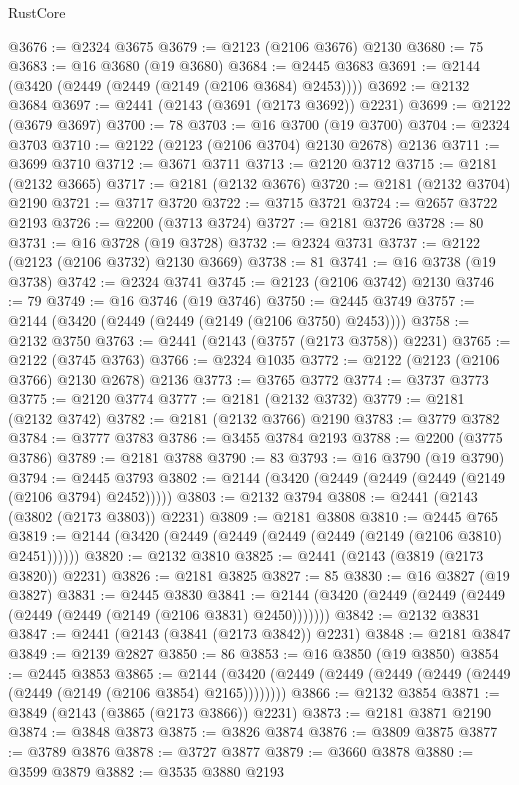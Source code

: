 \begin{lexlean}{RustCore}
\begin{coremodule}
@3676 := @2324 @3675
@3679 := @2123 (@2106 @3676) @2130
@3680 := 75
@3683 := @16 @3680 (@19 @3680)
@3684 := @2445 @3683
@3691 := @2144 (@3420 (@2449 (@2449 (@2149 (@2106 @3684) @2453))))
@3692 := @2132 @3684
@3697 := @2441 (@2143 (@3691 (@2173 @3692)) @2231)
@3699 := @2122 (@3679 @3697)
@3700 := 78
@3703 := @16 @3700 (@19 @3700)
@3704 := @2324 @3703
@3710 := @2122 (@2123 (@2106 @3704) @2130 @2678) @2136
@3711 := @3699 @3710
@3712 := @3671 @3711
@3713 := @2120 @3712
@3715 := @2181 (@2132 @3665)
@3717 := @2181 (@2132 @3676)
@3720 := @2181 (@2132 @3704) @2190
@3721 := @3717 @3720
@3722 := @3715 @3721
@3724 := @2657 @3722 @2193
@3726 := @2200 (@3713 @3724)
@3727 := @2181 @3726
@3728 := 80
@3731 := @16 @3728 (@19 @3728)
@3732 := @2324 @3731
@3737 := @2122 (@2123 (@2106 @3732) @2130 @3669)
@3738 := 81
@3741 := @16 @3738 (@19 @3738)
@3742 := @2324 @3741
@3745 := @2123 (@2106 @3742) @2130
@3746 := 79
@3749 := @16 @3746 (@19 @3746)
@3750 := @2445 @3749
@3757 := @2144 (@3420 (@2449 (@2449 (@2149 (@2106 @3750) @2453))))
@3758 := @2132 @3750
@3763 := @2441 (@2143 (@3757 (@2173 @3758)) @2231)
@3765 := @2122 (@3745 @3763)
@3766 := @2324 @1035
@3772 := @2122 (@2123 (@2106 @3766) @2130 @2678) @2136
@3773 := @3765 @3772
@3774 := @3737 @3773
@3775 := @2120 @3774
@3777 := @2181 (@2132 @3732)
@3779 := @2181 (@2132 @3742)
@3782 := @2181 (@2132 @3766) @2190
@3783 := @3779 @3782
@3784 := @3777 @3783
@3786 := @3455 @3784 @2193
@3788 := @2200 (@3775 @3786)
@3789 := @2181 @3788
@3790 := 83
@3793 := @16 @3790 (@19 @3790)
@3794 := @2445 @3793
@3802 := @2144 (@3420 (@2449 (@2449 (@2449 (@2149 (@2106 @3794) @2452)))))
@3803 := @2132 @3794
@3808 := @2441 (@2143 (@3802 (@2173 @3803)) @2231)
@3809 := @2181 @3808
@3810 := @2445 @765
@3819 := @2144 (@3420 (@2449 (@2449 (@2449 (@2449 (@2149 (@2106 @3810) @2451))))))
@3820 := @2132 @3810
@3825 := @2441 (@2143 (@3819 (@2173 @3820)) @2231)
@3826 := @2181 @3825
@3827 := 85
@3830 := @16 @3827 (@19 @3827)
@3831 := @2445 @3830
@3841 := @2144 (@3420 (@2449 (@2449 (@2449 (@2449 (@2449 (@2149 (@2106 @3831) @2450)))))))
@3842 := @2132 @3831
@3847 := @2441 (@2143 (@3841 (@2173 @3842)) @2231)
@3848 := @2181 @3847
@3849 := @2139 @2827
@3850 := 86
@3853 := @16 @3850 (@19 @3850)
@3854 := @2445 @3853
@3865 := @2144 (@3420 (@2449 (@2449 (@2449 (@2449 (@2449 (@2449 (@2149 (@2106 @3854) @2165))))))))
@3866 := @2132 @3854
@3871 := @3849 (@2143 (@3865 (@2173 @3866)) @2231)
@3873 := @2181 @3871 @2190
@3874 := @3848 @3873
@3875 := @3826 @3874
@3876 := @3809 @3875
@3877 := @3789 @3876
@3878 := @3727 @3877
@3879 := @3660 @3878
@3880 := @3599 @3879
@3882 := @3535 @3880 @2193

\end{coremodule}
\end{lexlean}
